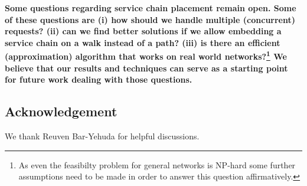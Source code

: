 \documentclass[11pt]{article}
\newcommand{\fix}[1]{{\color{purple}\textbf{#1}}}
\begin{document}
\fix{%
Some questions regarding service chain placement remain open. 
Some of these questions are (i) how should we handle multiple (concurrent) requests? (ii) can we find better solutions if we allow embedding a service chain on a walk instead of a path? (iii) is there an efficient (approximation) algorithm that works on real world networks?\footnote{As even the feasibilty problem for general networks is NP-hard some further assumptions need to be made in order to answer this question affirmatively.}
We believe that our results and techniques can serve as a starting point for future work dealing with those questions.
}




\subsection*{Acknowledgement}

We thank Reuven Bar-Yehuda for helpful discussions.




\end{document}
